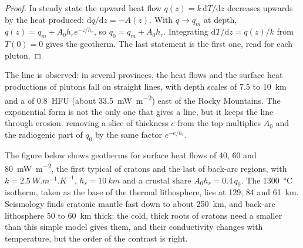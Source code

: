 \begin{proof}
In steady state the upward heat flow $q(z) = k\,\mathrm dT/\mathrm dz$ decreases
upwards by the heat produced: $\mathrm dq/\mathrm dz = -A(z)$. With $q \to q_m$
at depth, $q(z) = q_m + A_0h_re^{-z/h_r}$, so $q_0 = q_m + A_0h_r$. Integrating
$\mathrm dT/\mathrm dz = q(z)/k$ from $T(0) = 0$ gives the geotherm. The last
statement is the first one, read for each pluton.
\end{proof}

The line is observed: in several provinces, the heat flows and the surface heat
productions of plutons fall on straight lines, with depth scales of 7.5 to
\qty{10}{km} and a  of \qty{0.8}{HFU} (about
\qty{33.5}{mW.m^{-2}}) east of the Rocky Mountains. The exponential form is not
the only one that gives a line, but it keeps the line through erosion: removing a slice of thickness $e$ from the top multiplies
$A_0$ and the radiogenic part of $q_0$ by the same factor $e^{-e/h_r}$.

The figure below shows geotherms for surface heat flows of 40, 60 and
\qty{80}{mW.m^{-2}}, the first typical of cratons and the last of back-arc
regions, with $k = \qty{2.5}{W.m^{-1}.K^{-1}}$, $h_r = \qty{10}{km}$ and a
crustal share $A_0h_r = 0.4\,q_0$. The \qty{1300}{\celsius} isotherm, taken as
the base of the thermal lithosphere, lies at 129, 84 and \qty{61}{km}.
Seismology finds cratonic mantle fast down to about \qty{250}{km}, and back-arc
lithosphere 50 to \qty{60}{km} thick: the cold, thick roots of cratons need a
smaller  than this simple model gives them, and their
conductivity changes with temperature, but the order of the contrast is right.

